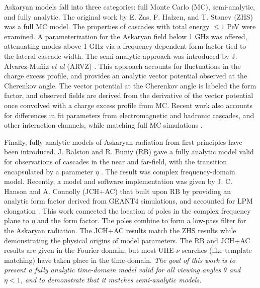 \documentclass[amsmath,amssymb,aps,prd,10pt,twocolumn]{revtex4}
\begin{document}
Askaryan models fall into three categories: full Monte Carlo (MC), semi-analytic, and fully analytic.  The original work by E. Zas, F. Halzen, and T. Stanev (ZHS) \cite{zhs} was a full MC model.  The properties of cascades with total energy $\leq 1$ PeV were examined.  A parameterization for the Askaryan field below 1 GHz was offered, attenuating modes above 1 GHz via a frequency-dependent form factor tied to the lateral cascade width.  The semi-analytic approach was introduced by J. Alvarez-Mu\~{n}iz \textit{et al} (ARVZ) \cite{10.1103/physrevd.84.103003}.  This approach accounts for fluctuations in the charge excess profile, and provides an analytic vector potential observed at the Cherenkov angle.  The vector potential at the Cherenkov angle is labeled the form factor, and observed fields are derived from the derivative of the vector potential once convolved with a charge excess profile from MC.  Recent work also accounts for differences in fit parameters from electromagnetic and hadronic cascades, and other interaction channels, while matching full MC simulations \cite{PhysRevD.101.083005}.

Finally, fully analytic models of Askaryan radiation from first principles have been introduced.  J. Ralston and R. Buniy (RB) gave a fully analytic model valid for observations of cascades in the near and far-field, with the transition encapsulated by a parameter $\eta$ \cite{10.1103/physrevd.65.016003}.  The result was complex frequency-domain model.  Recently, a model and software implementation was given by J. C. Hanson and A. Connolly (JCH+AC) that built upon RB by providing an analytic form factor derived from GEANT4 simulations, and accounted for LPM elongation \cite{10.1016/j.astropartphys.2017.03.008}.  This work connected the location of poles in the complex frequency plane to $\eta$ and the form factor.  The poles combine to form a low-pass filter for the Askaryan radiation.  The JCH+AC results match the ZHS results while demonstrating the physical origins of model parameters.  The RB and JCH+AC results are given in the Fourier domain, but most UHE-$\nu$ searches (like template matching) have taken place in the time-domain.  \textit{The goal of this work is to present a fully analytic time-domain model valid for all viewing angles $\theta$ and $\eta < 1$, and to demonstrate that it matches semi-analytic models.}
\end{document}
